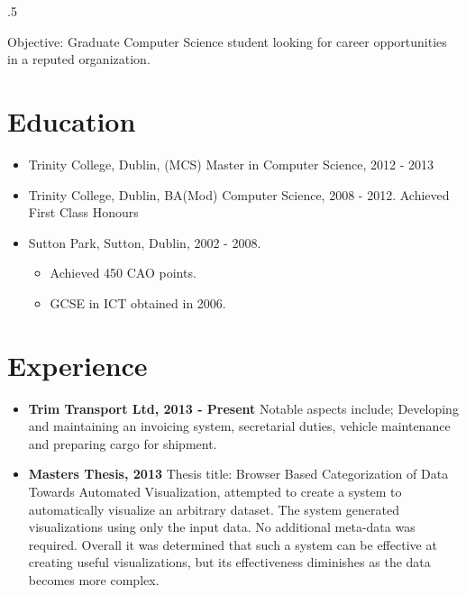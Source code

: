 \documentclass{res}
\begin{document}
 

\thispagestyle{empty} %
\pagestyle{empty}
\address{14 Strand Road\\
Sutton\\
Dublin 13\\
00 353 86 3807768\\
divines@tcd.ie}






\begin{resume}
\vspace{0.1in}
\moveleft.5\sectionwidth\centerline{Objective: Graduate Computer Science student looking for career opportunities in a reputed organization.}  


\section{Education}
\vspace{0.1in} 

  \begin{itemize}
    \item Trinity College, Dublin, (MCS) Master in Computer Science, 2012 - 2013
 
    \item Trinity College, Dublin, BA(Mod) Computer Science, 2008 - 2012. Achieved First Class Honours
 
    \item Sutton Park, Sutton, Dublin, 2002 - 2008.
      \begin{itemize}
        \item Achieved 450 CAO points.
        \item GCSE in ICT obtained in 2006.
      \end{itemize}
  \end{itemize}
    

\section{Experience} 
\vspace{0.1in}
  \begin{itemize}
    \item{\bf{Trim Transport Ltd, 2013 - Present}} Notable aspects include; Developing and maintaining an invoicing system, secretarial duties, vehicle maintenance and preparing cargo for shipment.\\

    \item{{\bf Masters Thesis, 2013}} Thesis title: Browser Based Categorization of Data Towards Automated Visualization, attempted to create a system to automatically visualize an arbitrary dataset. The system generated visualizations using only the input data. No additional meta-data was required. Overall it was determined that such a system can be effective at creating useful visualizations, but its effectiveness diminishes as the data becomes more complex.\\



\end{itemize}
\end{resume}
\end{document}
